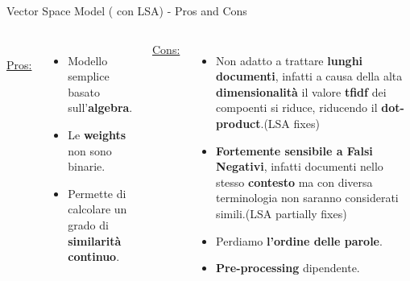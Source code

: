 \documentclass[british]{beamer}
\begin{document}
\begin{frame}{Vector Space Model ( con LSA) - Pros and Cons}	
	\begin{columns}
		\\
		\underline{Pros:}
		\begin{itemize}
			\item Modello semplice basato sull'\textbf{algebra}.
			\item Le \textbf{weights} non sono binarie.
			\item Permette di calcolare un grado di \textbf{similarit\`{a} continuo}.
		\end{itemize}
		\underline{Cons:}
		\begin{itemize}
			\item Non adatto a trattare \textbf{lunghi documenti}, infatti a causa della alta \textbf{dimensionalit\`{a}} il valore \textbf{tfidf} dei compoenti si riduce, riducendo il \textbf{dot-product}.(LSA fixes)
			\item \textbf{Fortemente sensibile a Falsi Negativi}, infatti documenti nello stesso \textbf{contesto} ma con diversa terminologia non saranno considerati simili.(LSA partially fixes)
			\item Perdiamo \textbf{l'ordine delle parole}.
			\item \textbf{Pre-processing} dipendente.
		\end{itemize}
	\end{columns}
\end{frame}

\end{document}
